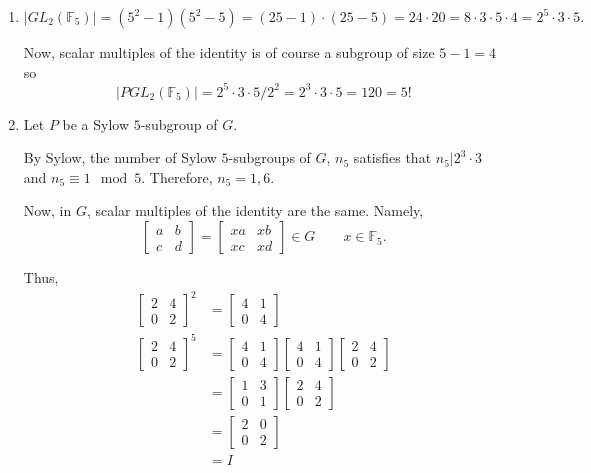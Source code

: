 \documentclass[12pt]{AlgebraQual}
\begin{document}
\begin{solution}$\,$
\begin{enumerate}[label=(\alph*)]
    \item $$|GL_2(\mathbb{F}_5)|=(5^2-1)(5^2-5)=(25-1)\cdot(25-5)=24\cdot 20=8\cdot 3\cdot 5\cdot 4=2^5\cdot3\cdot 5.$$

    Now, scalar multiples of the identity is of course a subgroup of size $5-1=4$ so $$|PGL_2(\mathbb{F}_5)|=2^5\cdot3\cdot 5/2^2=2^3\cdot3\cdot 5=120=5!$$

    \item Let $P$ be a Sylow $5$-subgroup of $G$.

    By Sylow, the number of Sylow $5$-subgroups of $G$, $n_5$ satisfies that $n_5|2^3\cdot3$ and $n_5\equiv 1\mod 5$. Therefore, $n_5=1,6.$

    Now, in $G$, scalar multiples of the identity are the same. Namely,  $$\begin{bmatrix}
    a & b\\
    c & d
    \end{bmatrix}=\begin{bmatrix}
    xa & xb\\
    xc & xd
    \end{bmatrix}\in G\qquad x\in \mathbb{F}_5.$$

    Thus, \begin{align*}
    \begin{bmatrix}
    2 & 4\\
    0 & 2
    \end{bmatrix}^2&=\begin{bmatrix}
    4 & 1\\
    0 & 4
    \end{bmatrix}\\
    \begin{bmatrix}
    2 & 4\\
    0 & 2
    \end{bmatrix}^5&=\begin{bmatrix}
    4 & 1\\
    0 & 4
    \end{bmatrix}\begin{bmatrix}
    4 & 1\\
    0 & 4
    \end{bmatrix}\begin{bmatrix}
    2 & 4\\
    0 & 2
    \end{bmatrix}\\
    &=\begin{bmatrix}
    1 & 3\\
    0 & 1
    \end{bmatrix}\begin{bmatrix}
    2 & 4\\
    0 & 2
    \end{bmatrix}\\
    &=\begin{bmatrix}
    2 & 0\\
    0 & 2
    \end{bmatrix}\\
    &=I
    \end{align*}


\end{enumerate}
\end{solution}
\end{document}
